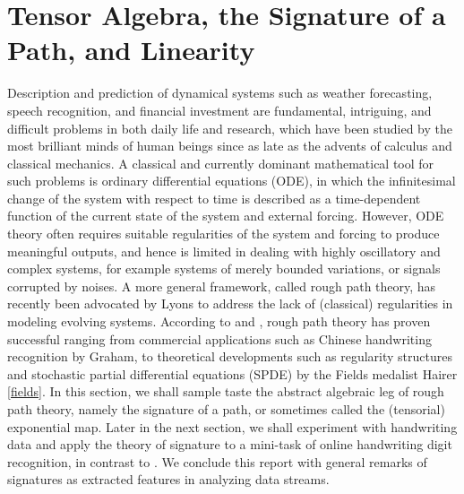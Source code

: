 \documentclass[fleqn]{article}
\theoremstyle{definition}
\theoremstyle{remark}
\begin{document}
\section{Tensor Algebra, the Signature of a Path, and Linearity} \label{Sec:sig}
Description and prediction of dynamical systems such as weather forecasting, speech recognition, and financial investment are fundamental, intriguing, and difficult problems in both daily life and research, which have been studied by the most brilliant minds of human beings since as late as the advents of calculus and classical mechanics. A classical and currently dominant mathematical tool for such problems is ordinary differential equations (ODE), in which the infinitesimal change of the system with respect to time is described as a time-dependent function of the current state  of the system and external forcing. However, ODE theory often requires suitable regularities of the system and forcing to produce meaningful outputs, and hence is limited in dealing with highly oscillatory and complex systems, for example systems of merely bounded variations, or signals corrupted by noises. A more general framework, called rough path theory, has recently been advocated by Lyons to address the lack of (classical) regularities in modeling evolving systems. According to \citet{lyons2014ICM} and \citet{Geng2016CCF}, rough path theory has proven successful ranging from commercial applications such as Chinese handwriting recognition by Graham, to theoretical developments such as regularity structures and stochastic partial differential equations (SPDE) by the Fields medalist Hairer \ref{fields}. In this section, we shall sample taste the abstract algebraic leg of rough path theory, namely the signature of a path, or sometimes called the (tensorial) exponential map. Later in the next section, we shall experiment with handwriting data and apply the theory of signature to a mini-task of online handwriting digit recognition, in contrast to \citet{Graham2013}. We conclude this report with general remarks of signatures as extracted features in analyzing data streams.
\end{document}
